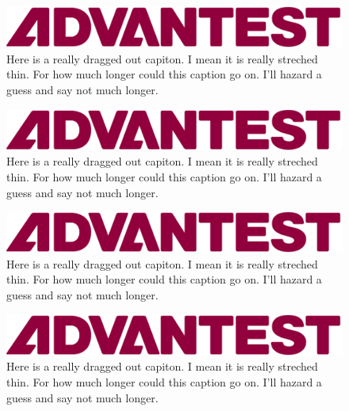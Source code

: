 \captionsetup[figure]{justification=centerlast, format=plain}

\begin{figure}[htbp!]
    \centering
    \includegraphics{img/advantest-logo.png}
    \caption{Here is a really dragged out capiton. I mean it is really streched thin. For how much longer could this caption go on. I'll hazard a guess and say not much longer.}
    \label{fig5}
\end{figure}

\captionsetup[figure]{justification=justified, format=plain}

\begin{figure}[htbp!]
    \centering
    \includegraphics{img/advantest-logo.png}
    \caption{Here is a really dragged out capiton. I mean it is really streched thin. For how much longer could this caption go on. I'll hazard a guess and say not much longer.}
    \label{fig6}
\end{figure}

\captionsetup[figure]{justification=justified, format=plain, labelsep=quad}

\begin{figure}[htbp!]
    \centering
    \includegraphics{img/advantest-logo.png}
    \caption{Here is a really dragged out capiton. I mean it is really streched thin. For how much longer could this caption go on. I'll hazard a guess and say not much longer.}
    \label{fig7}
\end{figure}

\captionsetup[figure]{format=hang, justification=justified, format=plain, labelsep=quad, labelfont = bf}

\begin{figure}[htbp!]
    \centering
    \includegraphics{img/advantest-logo.png}
    \caption{Here is a really dragged out capiton. I mean it is really streched thin. For how much longer could this caption go on. I'll hazard a guess and say not much longer.}
    \label{fig8}
\end{figure}

